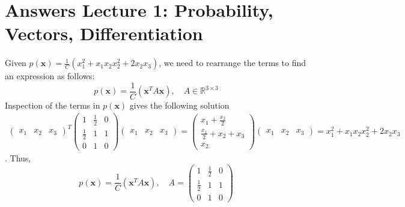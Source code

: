 \section{Answers Lecture 1: Probability, Vectors, Differentiation}

\paragraph{} 

Given $p(\textbf{x}) = \frac{1}{C}(x_1^2 + x_1x_2 x_2^2 + 2x_2x_3)$, we need to rearrange the terms to find an expression as follows:
\begin{equation}
p(\textbf{x}) = \frac{1}{C}(\textbf{x}^T A \textbf{x}), \quad A\in \mathbb{R}^{3\times 3}
\end{equation}
Inspection of the terms in $p(\textbf{x})$ gives the following solution
\begin{align*}
\begin{pmatrix}
x_1 & x_2 & x_3
\end{pmatrix}^T
\begin{pmatrix}
1 & \frac{1}{2} & 0\\
\frac{1}{2} & 1 & 1\\
0 & 1 & 0
\end{pmatrix}
\begin{pmatrix}
x_1 & x_2 & x_3
\end{pmatrix} =
\begin{pmatrix}
x_1 + \frac{x_2}{2}\\
\frac{x_1}{2} + x_2 + x_3\\
x_2
\end{pmatrix}
\begin{pmatrix}
x_1 & x_2 & x_3
\end{pmatrix} = x_1^2 + x_1x_2 x_2^2 + 2x_2x_3
\end{align*}.
Thus,
\begin{equation}
p(\textbf{x}) = \frac{1}{C}(\textbf{x}^T A \textbf{x}), \quad A = \begin{pmatrix}
1 & \frac{1}{2} & 0\\
\frac{1}{2} & 1 & 1\\
0 & 1 & 0
\end{pmatrix}
\end{equation}


\paragraph{}

